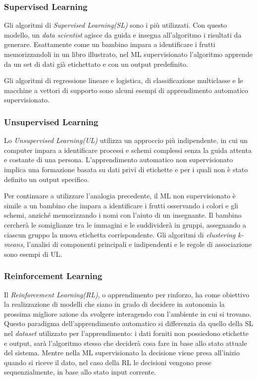 \subsubsection{Supervised Learning}

Gli algoritmi di \textit{Supervised Learning(SL)} sono i più utilizzati. Con questo modello, un \textit{data scientist} agisce da guida e insegna all'algoritmo i risultati da generare. Esattamente come un bambino impara a identificare i frutti memorizzandoli in un libro illustrato, nel ML supervisionato l'algoritmo apprende da un set di dati già etichettato e con un output predefinito.

Gli algoritmi di regressione lineare e logistica, di classificazione multiclasse e le macchine a vettori di supporto sono alcuni esempi di apprendimento automatico supervisionato.

\subsubsection{Unsupervised Learning}

Lo \textit{Unsupervised Learning(UL)} utilizza un approccio più indipendente, in cui un computer impara a identificare processi e schemi complessi senza la guida attenta e costante di una persona. L'apprendimento automatico non supervisionato implica una formazione basata su dati privi di etichette e per i quali non è stato definito un output specifico.

Per continuare a utilizzare l'analogia precedente, il ML non supervisionato è simile a un bambino che impara a identificare i frutti osservando i colori e gli schemi, anziché memorizzando i nomi con l'aiuto di un insegnante. Il bambino cercherà le somiglianze tra le immagini e le suddividerà in gruppi, assegnando a ciascun gruppo la nuova etichetta corrispondente. Gli algoritmi di \textit{clustering k-means}, l'analisi di componenti principali e indipendenti e le regole di associazione sono esempi di UL.

\subsubsection{Reinforcement Learning}

Il \textit{Reinforcement Learning(RL)}, o apprendimento per rinforzo, ha come obiettivo la realizzazione di modelli che siano in grado di decidere in autonomia la prossima migliore azione da svolgere interagendo con l'ambiente in cui si trovano. Questo paradigma dell'apprendimento automatico si differenzia da quello della SL nel \textit{dataset} utilizzato per l'apprendimento: i dati forniti non possiedono etichette e output, sarà l'algoritmo stesso che deciderà cosa fare in base allo stato attuale del sistema. Mentre nella ML supervisionato la decisione viene presa all'inizio quando si riceve il dato, nel caso della RL le decisioni vengono prese sequenzialmente, in base allo stato input corrente.

